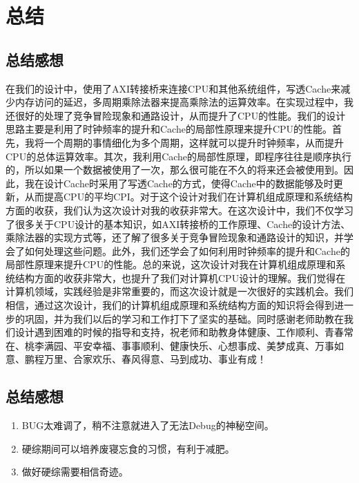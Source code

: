 \section{总结}
\subsection{\stunamea 总结感想}
在我们的设计中，使用了AXI转接桥来连接CPU和其他系统组件，写透Cache来减少内存访问的延迟，多周期乘除法器来提高乘除法的运算效率。在实现过程中，我还很好的处理了竞争冒险现象和通路设计，从而提升了CPU的性能。我们的设计思路主要是利用了时钟频率的提升和Cache的局部性原理来提升CPU的性能。首先，我将一个周期的事情细化为多个周期，这样就可以提升时钟频率，从而提升CPU的总体运算效率。其次，我利用Cache的局部性原理，即程序往往是顺序执行的，所以如果一个数据被使用了一次，那么很可能在不久的将来还会被使用到。因此，我在设计Cache时采用了写透Cache的方式，使得Cache中的数据能够及时更新，从而提高CPU的平均CPI。对于这个设计对我们在计算机组成原理和系统结构方面的收获，我们认为这次设计对我的收获非常大。在这次设计中，我们不仅学习了很多关于CPU设计的基本知识，如AXI转接桥的工作原理、Cache的设计方法、乘除法器的实现方式等，还了解了很多关于竞争冒险现象和通路设计的知识，并学会了如何处理这些问题。此外，我们还学会了如何利用时钟频率的提升和Cache的局部性原理来提升CPU的性能。总的来说，这次设计对我在计算机组成原理和系统结构方面的收获非常大，也提升了我们对计算机CPU设计的理解。我们觉得在计算机领域，实践经验是非常重要的，而这次设计就是一次很好的实践机会。我们相信，通过这次设计，我们的计算机组成原理和系统结构方面的知识将会得到进一步的巩固，并为我们以后的学习和工作打下了坚实的基础。同时感谢老师助教在我们设计遇到困难的时候的指导和支持，祝老师和助教身体健康、工作顺利、青春常在、桃李满园、平安幸福、事事顺利、健康快乐、心想事成、美梦成真、万事如意、鹏程万里、合家欢乐、春风得意、马到成功、事业有成！
\subsection{\stunameb 总结感想}
\begin{enumerate}
    \item BUG太难调了，稍不注意就进入了无法Debug的神秘空间。
    \item 硬综期间可以培养废寝忘食的习惯，有利于减肥。
    \item 做好硬综需要相信奇迹。
\end{enumerate}